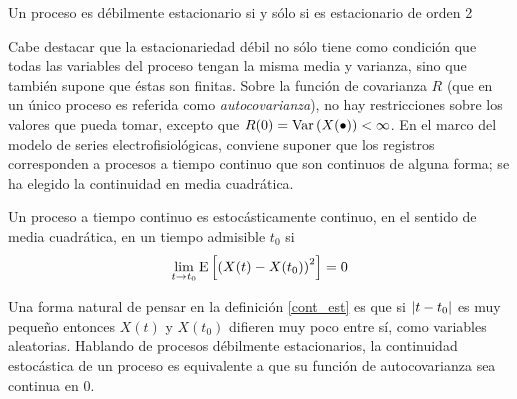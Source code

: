 \begin{proposicion}
Un proceso es débilmente estacionario si y sólo si es estacionario de orden 2
\end{proposicion}

Cabe destacar que la estacionariedad débil no sólo tiene como condición que todas las variables del
proceso tengan la misma media y varianza, sino que también supone que éstas son finitas.
%
Sobre la función de covarianza $R$ (que en un único proceso es referida como \textit{autocovarianza}),
no hay restricciones sobre los valores que pueda tomar, excepto que 
$R(0) = \mathrm{Var}\left( X(\bullet) \right) < \infty$. 
%
En el marco del modelo de series electrofisiológicas, conviene suponer que los registros 
corresponden a procesos a tiempo continuo que son continuos de alguna forma; se ha elegido la 
continuidad en media cuadrática.


\begin{definicion}
Un proceso a tiempo continuo \xt es estocásticamente continuo, en el sentido de media cuadrática, 
en un tiempo admisible $t_0$ si
\begin{equation*}
\lim_{t \rightarrow t_0} \mathrm{E}\left[ \left( X(t) - X(t_0) \right)^{2} \right] = 0
\end{equation*}
\label{cont_est}
\end{definicion}

Una forma natural de pensar en la definición \ref{cont_est} es que si $\left| t-t_0 \right|$ es muy pequeño 
entonces $X(t)$ y $X(t_0)$ difieren muy poco entre sí, como variables aleatorias.
%
Hablando de procesos débilmente estacionarios, la continuidad estocástica de un proceso es 
equivalente a que su función de autocovarianza sea continua en 0.

